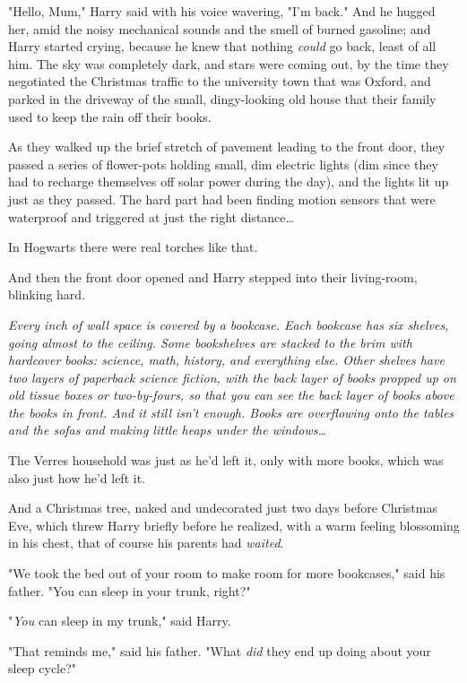 "Hello, Mum," Harry said with his voice wavering, "I'm back." And he hugged 
her, amid the noisy mechanical sounds and the smell of burned gasoline; and 
Harry started crying, because he knew that nothing \emph{could} go back, least 
of all him.
\sbreak
The sky was completely dark, and stars were coming out, by the time they 
negotiated the Christmas traffic to the university town that was Oxford, and 
parked in the driveway of the small, dingy-looking old house that their family 
used to keep the rain off their books.

As they walked up the brief stretch of pavement leading to the front door, they 
passed a series of flower-pots holding small, dim electric lights (dim since 
they had to recharge themselves off solar power during the day), and the lights 
lit up just as they passed. The hard part had been finding motion sensors that 
were waterproof and triggered at just the right distance{\ldots}

In Hogwarts there were real torches like that.

And then the front door opened and Harry stepped into their living-room, 
blinking hard.

\emph{Every inch of wall space is covered by a bookcase. Each bookcase has six 
shelves, going almost to the ceiling. Some bookshelves are stacked to the brim 
with hardcover books: science, math, history, and everything else. Other 
shelves have two layers of paperback science fiction, with the back layer of 
books propped up on old tissue boxes or two-by-fours, so that you can see the 
back layer of books above the books in front. And it still isn't enough. Books 
are overflowing onto the tables and the sofas and making little heaps under the 
windows{\ldots}}

The Verres household was just as he'd left it, only with more books, which was 
also just how he'd left it.

And a Christmas tree, naked and undecorated just two days before Christmas Eve, 
which threw Harry briefly before he realized, with a warm feeling blossoming in 
his chest, that of course his parents had \emph{waited}.

"We took the bed out of your room to make room for more bookcases," said his 
father. "You can sleep in your trunk, right?"

"\emph{You} can sleep in my trunk," said Harry.

"That reminds me," said his father. "What \emph{did} they end up doing about 
your sleep cycle?"

